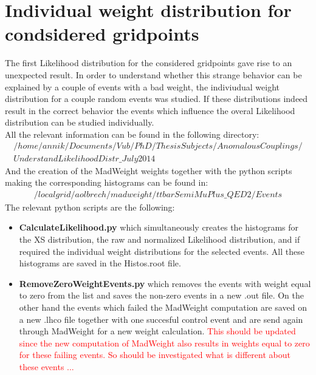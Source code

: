 \section{Individual weight distribution for condsidered gridpoints}
The first Likelihood distribution for the considered gridpoints gave rise to an unexpected result. In order to understand whether this strange behavior can be explained by a couple of events with a bad weight, the indiviudual weight distribution for a couple random events was studied. If these distributions indeed result in the correct behavior the events which influence the overal Likelihood distribution can be studied individually.\\
All the relevant information can be found in the following directory:
\begin{eqnarray*}
 /home/annik/Documents/Vub/PhD/ThesisSubjects/AnomalousCouplings/ \\ UnderstandLikelihoodDistr\_July2014
\end{eqnarray*}
And the creation of the MadWeight weights together with the python scripts making the corresponding histograms can be found in:
\begin{eqnarray*}
 /localgrid/aolbrech/madweight/ttbarSemiMuPlus\_QED2/Events
\end{eqnarray*}
The relevant python scripts are the following:
\begin{itemize}
 \item \textbf{CalculateLikelihood.py} which simultaneously creates the histograms for the XS distribution, the raw and normalized Likelihood distribution, and if required the individual weight distributions for the selected events. All these histograms are saved in the Histos.root file.
 \item \textbf{RemoveZeroWeightEvents.py} which removes the events with weight equal to zero from the list and saves the non-zero events in a new .out file. On the other hand the events which failed the MadWeight computation are saved on a new .lhco file together with one succesful control event and are send again through MadWeight for a new weight calculation. \textcolor{red}{This should be updated since the new computation of MadWeight also results in weights equal to zero for these failing events. So should be investigated what is different about these events ...}
\end{itemize}

